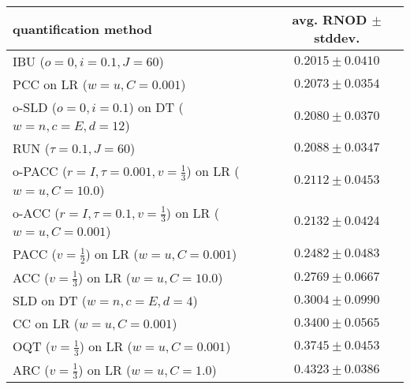 \begin{tabular}{lc}
  \toprule
  quantification method & avg. RNOD $\pm$ stddev. \\
  \midrule
  IBU ($o=0, i=0.1, J=60$) & $\mathbf{0.2015 \pm 0.0410}$ \\
  PCC on LR ($w=u, C=0.001$) & $0.2073 \pm 0.0354$ \\
  o-SLD ($o=0, i=0.1$) on DT ($w=n, c=E, d=12$) & $0.2080 \pm 0.0370$ \\
  RUN ($\tau=0.1, J=60$) & $0.2088 \pm 0.0347$ \\
  o-PACC ($r=I, \tau=0.001, v=\frac{1}{3}$) on LR ($w=u, C=10.0$) & $0.2112 \pm 0.0453$ \\
  o-ACC ($r=I, \tau=0.1, v=\frac{1}{3}$) on LR ($w=u, C=0.001$) & $0.2132 \pm 0.0424$ \\
  PACC ($v=\frac{1}{2}$) on LR ($w=u, C=0.001$) & $0.2482 \pm 0.0483$ \\
  ACC ($v=\frac{1}{3}$) on LR ($w=u, C=10.0$) & $0.2769 \pm 0.0667$ \\
  SLD on DT ($w=n, c=E, d=4$) & $0.3004 \pm 0.0990$ \\
  CC on LR ($w=u, C=0.001$) & $0.3400 \pm 0.0565$ \\
  OQT ($v=\frac{1}{3}$) on LR ($w=u, C=0.001$) & $0.3745 \pm 0.0453$ \\
  ARC ($v=\frac{1}{3}$) on LR ($w=u, C=1.0$) & $0.4323 \pm 0.0386$ \\
  \bottomrule
\end{tabular}
